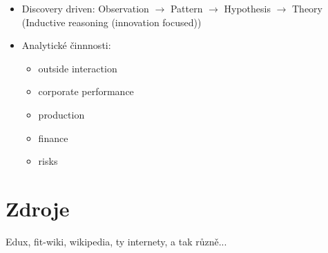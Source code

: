 \documentclass[a4paper,hidelinks]{article}
\begin{document}
\begin{itemize}
\begin{itemize}
        \item Discovery driven: Observation $\to$ Pattern $\to$ Hypothesis $\to$ Theory (Inductive reasoning (innovation focused))
        \item Analytické činnnosti:
        \begin{itemize}
            \item outside interaction
            \item corporate performance
            \item production
            \item finance
            \item risks            
        \end{itemize}
    \end{itemize}
\end{itemize}

\section*{Zdroje}

Edux, fit-wiki, wikipedia, ty internety, a tak různě...
\end{document}

